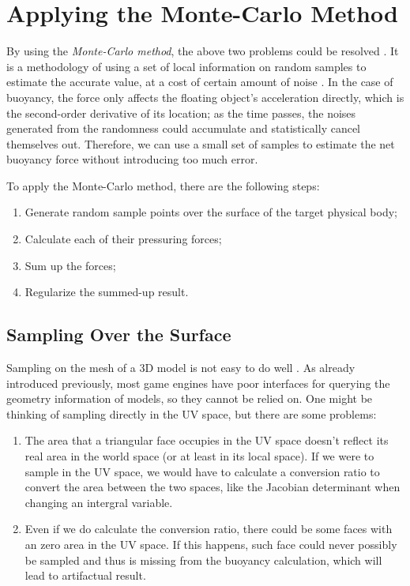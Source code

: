 \section{Applying the Monte-Carlo Method}

By using the \emph{Monte-Carlo method}, the above two problems could be resolved \cite{kroese2014monte}.
It is a methodology of using a set of local information on random samples to estimate the accurate value, at a cost of certain amount of noise \cite{james1980monte}.
In the case of buoyancy, the force only affects the floating object's acceleration directly, which is the second-order derivative of its location;
as the time passes, the noises generated from the randomness could accumulate and statistically cancel themselves out.
Therefore, we can use a small set of samples to estimate the net buoyancy force without introducing too much error.

To apply the Monte-Carlo method, there are the following steps:
\begin{enumerate}
	\item Generate random sample points over the surface of the target physical body;
	\item Calculate each of their pressuring forces;
	\item Sum up the forces;
	\item Regularize the summed-up result.
\end{enumerate}

\subsection{Sampling Over the Surface}

Sampling on the mesh of a 3D model is not easy to do well \cite{ebeida2012uniform}.
As already introduced previously, most game engines have poor interfaces for querying the geometry information of models, so they cannot be relied on.
One might be thinking of sampling directly in the UV space, but there are some problems:
\begin{enumerate}
	\item
		The area that a triangular face occupies in the UV space doesn't reflect its real area in the world space (or at least in its local space).
		If we were to sample in the UV space, we would have to calculate a conversion ratio to convert the area between the two spaces, like the Jacobian determinant when changing an intergral variable.
	\item Even if we do calculate the conversion ratio, there could be some faces with an zero area in the UV space.
		If this happens, such face could never possibly be sampled and thus is missing from the buoyancy calculation, which will lead to artifactual result.
\end{enumerate}

